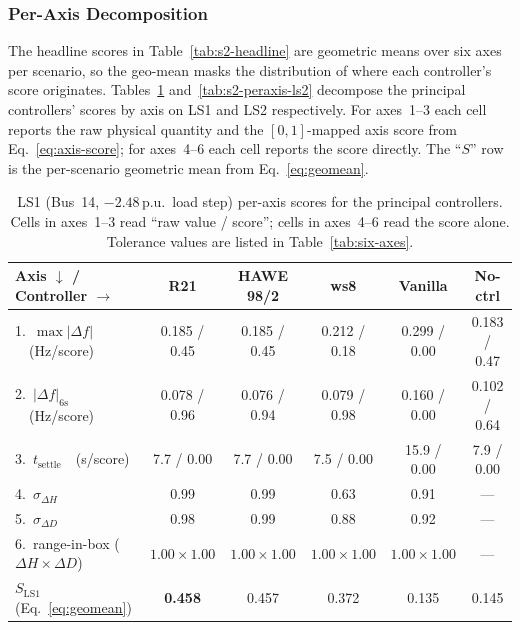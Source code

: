 \documentclass{unnc-fyp}
\begin{document}
\subsubsection{Per-Axis Decomposition}
\label{sec:s2-peraxis}

The headline scores in Table~\ref{tab:s2-headline} are geometric
means over six axes per scenario, so the geo-mean masks the
distribution of where each controller's score originates.
Tables~\ref{tab:s2-peraxis-ls1} and~\ref{tab:s2-peraxis-ls2}
decompose the principal controllers' scores by axis on LS1 and LS2
respectively.
For axes~1--3 each cell reports the raw physical quantity and the
$[0, 1]$-mapped axis score from Eq.~\eqref{eq:axis-score};
for axes~4--6 each cell reports the score directly.
The ``$S$'' row is the per-scenario geometric mean from
Eq.~\eqref{eq:geomean}.

\begin{table}[tb]
  \centering
  \small
  \caption{LS1 (Bus~14, $-2.48$\,p.u.\ load step) per-axis scores
           for the principal controllers. Cells in axes~1--3 read
           ``raw value / score''; cells in axes~4--6 read the score
           alone. Tolerance values are listed in
           Table~\ref{tab:six-axes}.}
  \label{tab:s2-peraxis-ls1}
  \begin{tabular}{@{}lccccc@{}}
    \toprule
    Axis $\downarrow$ / Controller $\rightarrow$
      & R21 & HAWE 98/2 & ws8 & Vanilla & No-ctrl \\
    \midrule
    1.\ $\max|\Delta f|$\ \ (Hz/score)
      & 0.185 / 0.45 & 0.185 / 0.45 & 0.212 / 0.18 & 0.299 / 0.00 & 0.183 / 0.47 \\
    2.\ $|\Delta f|_{6\mathrm{s}}$\ \ (Hz/score)
      & 0.078 / 0.96 & 0.076 / 0.94 & 0.079 / 0.98 & 0.160 / 0.00 & 0.102 / 0.64 \\
    3.\ $t_\mathrm{settle}$\ \ (s/score)
      & 7.7 / 0.00 & 7.7 / 0.00 & 7.5 / 0.00 & 15.9 / 0.00 & 7.9 / 0.00 \\
    4.\ $\sigma_{\Delta H}$
      & 0.99 & 0.99 & 0.63 & 0.91 & --- \\
    5.\ $\sigma_{\Delta D}$
      & 0.98 & 0.99 & 0.88 & 0.92 & --- \\
    6.\ range-in-box ($\Delta H \times \Delta D$)
      & $1.00 \times 1.00$ & $1.00 \times 1.00$ & $1.00 \times 1.00$ & $1.00 \times 1.00$ & --- \\
    \midrule
    $S_\mathrm{LS1}$ (Eq.~\eqref{eq:geomean})
      & \textbf{0.458} & 0.457 & 0.372 & 0.135 & 0.145 \\
    \bottomrule
  \end{tabular}
\end{table}
\end{document}

